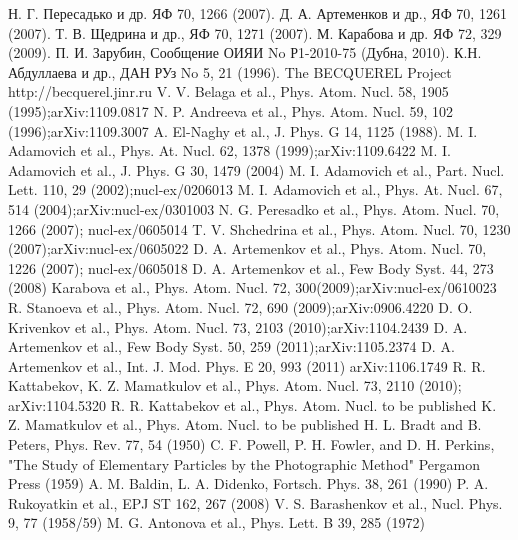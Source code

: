 \documentclass[fontsize=14pt]{scrarticle}
\begin{document}
\newpage
\begin{thebibliography}{57}
 {Н. Г. Пересадько и др. ЯФ 70, 1266 (2007).}
 {Д. А. Артеменков и др., ЯФ 70, 1261 (2007).}
 {Т. В. Щедрина и др., ЯФ 70, 1271 (2007).}
 {М. Карабова и др. ЯФ 72, 329 (2009).}
 {П. И. Зарубин, Сообщение ОИЯИ No Р1-2010-75 (Дубна, 2010).}
 {К.Н. Абдуллаева и др., ДАН РУз No 5, 21 (1996).}
 {The BECQUEREL Project http://becquerel.jinr.ru}
 {V. V. Belaga et al., Phys. Atom. Nucl. 58, 1905 (1995);arXiv:1109.0817}
 {N. P. Andreeva et al., Phys. Atom. Nucl. 59, 102 (1996);arXiv:1109.3007}
 {A. El-Naghy et al., J. Phys. G 14, 1125 (1988).}
 {M. I. Adamovich et al., Phys. At. Nucl. 62, 1378 (1999);arXiv:1109.6422}
 {M. I. Adamovich et al., J. Phys. G 30, 1479 (2004)}
 {M. I. Adamovich et al., Part. Nucl. Lett. 110, 29 (2002);nucl-ex/0206013}
 {M. I. Adamovich et al., Phys. At. Nucl. 67, 514 (2004);arXiv:nucl-ex/0301003}
 {N. G. Peresadko et al., Phys. Atom. Nucl. 70, 1266 (2007); nucl-ex/0605014}
 {T. V. Shchedrina et al., Phys. Atom. Nucl. 70, 1230 (2007);arXiv:nucl-ex/0605022}
 {D. A. Artemenkov et al., Phys. Atom. Nucl. 70, 1226 (2007); nucl-ex/0605018}
 {D. A. Artemenkov et al., Few Body Syst. 44, 273 (2008)}
 {Karabova et al., Phys. Atom. Nucl. 72, 300(2009);arXiv:nucl-ex/0610023}
 {R. Stanoeva et al., Phys. Atom. Nucl. 72, 690 (2009);arXiv:0906.4220}
 {D. O. Krivenkov et al., Phys. Atom. Nucl. 73, 2103 (2010);arXiv:1104.2439}
 {D. A. Artemenkov et al., Few Body Syst. 50, 259 (2011);arXiv:1105.2374}
 {D. A. Artemenkov et al., Int. J. Mod. Phys. E 20, 993 (2011) arXiv:1106.1749}
 {R. R. Kattabekov, K. Z. Mamatkulov et al., Phys. Atom. Nucl. 73, 2110 (2010); arXiv:1104.5320}
 {R. R. Kattabekov et al., Phys. Atom. Nucl. to be published}
 {K. Z. Mamatkulov et al., Phys. Atom. Nucl. to be published}
 {H. L. Bradt and B. Peters, Phys. Rev. 77, 54 (1950)}
 {C. F. Powell, P. H. Fowler, and D. H. Perkins, "The Study of Elementary Particles by the Photographic Method" Pergamon Press (1959)}
 {A. M. Baldin, L. A. Didenko, Fortsch. Phys. 38, 261 (1990)}
 {P. A. Rukoyatkin et al., EPJ ST 162, 267 (2008)}
 {V. S. Barashenkov et al., Nucl. Phys. 9, 77 (1958/59)}
 {M. G. Antonova et al., Phys. Lett. B 39, 285 (1972)}

\end{thebibliography}
\end{document}
